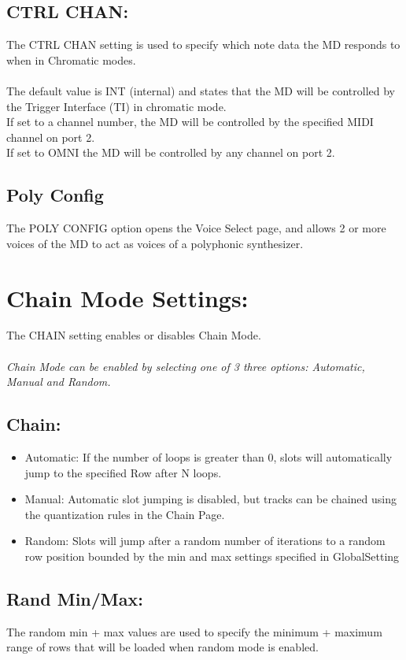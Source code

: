 \subsection{CTRL CHAN:}
The CTRL CHAN setting is used to specify which note data the MD responds to when in Chromatic modes. \\\\The default value is INT (internal) and states that the MD will be controlled by the Trigger Interface (TI) in chromatic mode. 
\\If set to a channel number, the MD will be controlled by the specified MIDI channel on port 2. 
\\If set to OMNI the MD will be controlled by any channel on port 2.
\subsection{Poly Config}
The POLY CONFIG option opens the Voice Select page, and allows 2 or more voices of the MD to act as voices of a polyphonic synthesizer.
\section{Chain Mode Settings:}
The CHAIN setting enables or disables Chain Mode.\\
\\
\textit{ Chain Mode can be enabled by selecting one of 3 three options: Automatic, Manual and Random.}
\subsection{Chain:}
\begin{itemize}
	\item Automatic: If the number of loops is greater than 0, slots will automatically jump to the specified Row after N loops.
	\item Manual: Automatic slot jumping is disabled, but tracks can be chained using the quantization rules in the Chain Page.
	\item Random: Slots will jump after a random number of iterations to a random row position bounded by the min and max settings specified in GlobalSetting
\end{itemize}
\subsection{Rand Min/Max:}
The random min + max values are used to specify the minimum + maximum range of rows that will be loaded when random mode is enabled.
